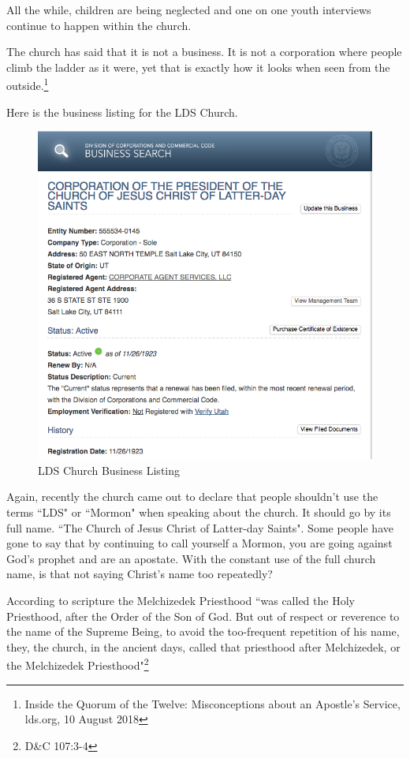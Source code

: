All the while, children are being neglected and one on one youth interviews continue 
to happen within the church.

The church has said that it is not a business. It is not a corporation where people
climb the ladder as it were, yet that is exactly how it looks when seen from the
outside.\footnote{Inside the Quorum of the Twelve: Misconceptions about an Apostle's
Service, lds.org, 10 August 2018}

Here is the business listing for the LDS Church.

\begin{figure}[h!]
  \centering
  \includegraphics[width=1\linewidth]{articles/images/business.png}
  \caption{LDS Church Business Listing}
  \label{fig:business}
\end{figure}

Again, recently the church came out to declare that people shouldn't use the terms
``LDS" or ``Mormon" when speaking about the church. It should go by its full name.
``The Church of Jesus Christ of Latter-day Saints". Some people have gone to say that
by continuing to call yourself a Mormon, you are going against God's prophet and are
an apostate. With the constant use of the full church name, is that not saying
Christ's name too repeatedly?

According to scripture the Melchizedek Priesthood ``was called the Holy Priesthood, 
after the Order of the Son of God. But out of respect or reverence to the name of 
the Supreme Being, to avoid the too-frequent repetition of his name, 
they, the church, in the ancient days, called that priesthood after 
Melchizedek, or the Melchizedek Priesthood"\footnote{D\&C 107:3-4}

